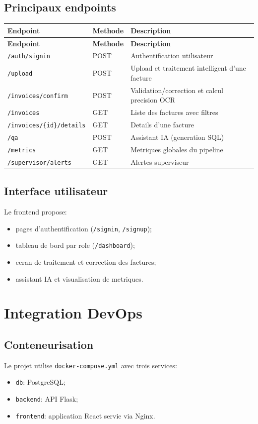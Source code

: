 \documentclass[12pt,a4paper]{report}
\begin{document}
\section{Principaux endpoints}
\begin{longtable}{p{4cm}p{2.5cm}p{7.5cm}}
    \toprule
    \textbf{Endpoint} & \textbf{Methode} & \textbf{Description} \\
    \midrule
    \endfirsthead
    \toprule
    \textbf{Endpoint} & \textbf{Methode} & \textbf{Description} \\
    \midrule
    \endhead
    \texttt{/auth/signin} & POST & Authentification utilisateur \\
    \texttt{/upload} & POST & Upload et traitement intelligent d'une facture \\
    \texttt{/invoices/confirm} & POST & Validation/correction et calcul precision OCR \\
    \texttt{/invoices} & GET & Liste des factures avec filtres \\
    \texttt{/invoices/\{id\}/details} & GET & Details d'une facture \\
    \texttt{/qa} & POST & Assistant IA (generation SQL) \\
    \texttt{/metrics} & GET & Metriques globales du pipeline \\
    \texttt{/supervisor/alerts} & GET & Alertes superviseur \\
    \bottomrule
\end{longtable}

\section{Interface utilisateur}
Le frontend propose:
\begin{itemize}
    \item pages d'authentification (\texttt{/signin}, \texttt{/signup});
    \item tableau de bord par role (\texttt{/dashboard});
    \item ecran de traitement et correction des factures;
    \item assistant IA et visualisation de metriques.
\end{itemize}

\chapter{Integration DevOps}
\section{Conteneurisation}
Le projet utilise \texttt{docker-compose.yml} avec trois services:
\begin{itemize}
    \item \texttt{db}: PostgreSQL;
    \item \texttt{backend}: API Flask;
    \item \texttt{frontend}: application React servie via Nginx.
\end{itemize}
\end{document}
